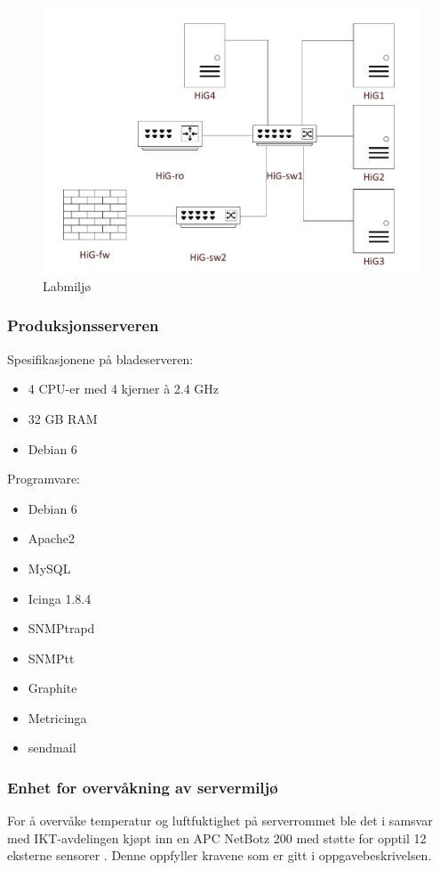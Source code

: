 \begin{figure}[H]
    \centering
    \includegraphics[scale=0.4]{img/labmiljo}
    \caption{Labmiljø}
    \label{laboppsett}
\end{figure}


\subsubsection{Produksjonsserveren}
Spesifikasjonene på bladeserveren:
\begin{itemize}
\item 4 CPU-er med 4 kjerner à 2.4 GHz
\item 32 GB RAM
\item Debian 6
\end{itemize}
Programvare:
\begin{itemize}
\item Debian 6
\item Apache2
\item MySQL
\item Icinga 1.8.4
\item SNMPtrapd
\item SNMPtt
\item Graphite
\item Metricinga 
\item sendmail
\end{itemize}

\subsubsection{Enhet for overvåkning av servermiljø}
For å overvåke temperatur og luftfuktighet på serverrommet ble det i samsvar med IKT-avdelingen kjøpt inn en APC NetBotz 200 med støtte for opptil 12 eksterne sensorer \cite{netbotz}. Denne oppfyller kravene som er gitt i oppgavebeskrivelsen. 

